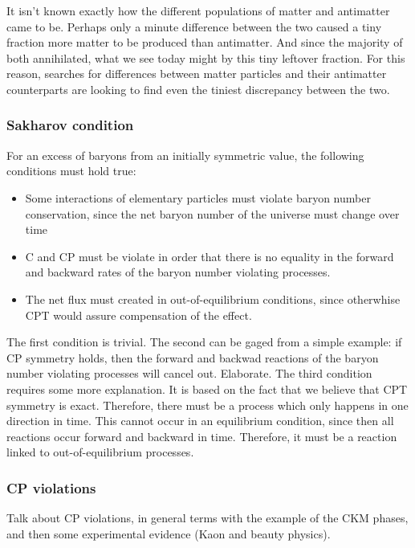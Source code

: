 It isn't known exactly how the different populations of matter and antimatter came to be. Perhaps only a minute difference between the two caused a tiny fraction more matter to be produced than antimatter. And since the majority of both annihilated, what we see today might by this tiny leftover fraction. For this reason, searches for differences between matter particles and their antimatter counterparts are looking to find even the tiniest discrepancy between the two\cite{}. 

\subsubsection{Sakharov condition}\label{sec:IntroSakharovContidion}
For an excess of baryons from an initially symmetric value, the following conditions must hold true:
\begin{itemize}
    \item Some interactions of elementary particles must violate baryon number conservation, since the net baryon number of the universe must change over time
    \item C and CP must be violate in order that there is no equality in the forward and backward rates of the baryon number violating processes. 
    \item The net flux must created in out-of-equilibrium conditions, since otherwhise CPT would assure compensation of the effect. 
\end{itemize}

The first condition is trivial. The second can be gaged from a simple example: if CP symmetry holds, then the forward and backwad reactions of the baryon number violating processes will cancel out. Elaborate. The third condition requires some more explanation. It is based on the fact that we believe that CPT symmetry is exact. Therefore, there must be a process which only happens in one direction in time. This cannot occur in an equilibrium condition, since then all reactions occur forward and backward in time. Therefore, it must be a reaction linked to out-of-equilibrium processes. 
\subsubsection{CP violations}
Talk about CP violations, in general terms with the example of the CKM phases, and then some experimental evidence (Kaon and beauty physics). 

